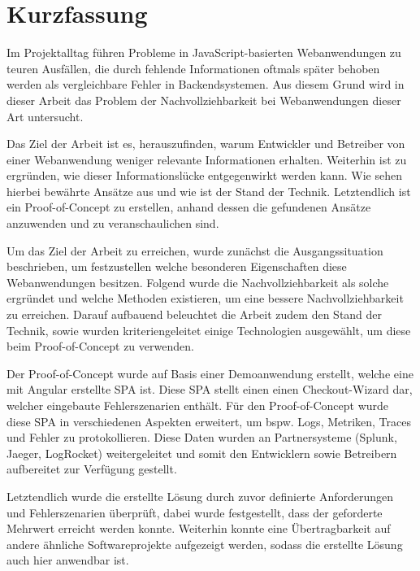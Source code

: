 \section*{\thispagestyle{empty}Kurzfassung}
	
Im Projektalltag führen Probleme in JavaScript-basierten Webanwendungen zu teuren Ausfällen, die durch fehlende Informationen oftmals später behoben werden als vergleichbare Fehler in Backendsystemen. Aus diesem Grund wird in dieser Arbeit das Problem der Nachvollziehbarkeit bei Webanwendungen dieser Art untersucht.
	
Das Ziel der Arbeit ist es, herauszufinden, warum Entwickler und Betreiber von einer Webanwendung weniger relevante Informationen erhalten. Weiterhin ist zu ergründen, wie dieser Informationslücke entgegenwirkt werden kann. Wie sehen hierbei bewährte Ansätze aus und wie ist der Stand der Technik. Letztendlich ist ein Proof-of-Concept zu erstellen, anhand dessen die gefundenen Ansätze anzuwenden und zu veranschaulichen sind.

Um das Ziel der Arbeit zu erreichen, wurde zunächst die Ausgangssituation beschrieben, um festzustellen welche besonderen Eigenschaften diese Webanwendungen besitzen. Folgend wurde die Nachvollziehbarkeit als solche ergründet und welche Methoden existieren, um eine bessere Nachvollziehbarkeit zu erreichen. Darauf aufbauend beleuchtet die Arbeit zudem den Stand der Technik, sowie wurden kriteriengeleitet einige Technologien ausgewählt, um diese beim Proof-of-Concept zu verwenden.

Der Proof-of-Concept wurde auf Basis einer Demoanwendung erstellt, welche eine mit Angular erstellte SPA ist. Diese SPA stellt einen einen Checkout-Wizard dar, welcher eingebaute Fehlerszenarien enthält. Für den Proof-of-Concept wurde diese SPA in verschiedenen Aspekten erweitert, um bspw. Logs, Metriken, Traces und Fehler zu protokollieren. Diese Daten wurden an Partnersysteme (Splunk, Jaeger, LogRocket) weitergeleitet und somit den Entwicklern sowie Betreibern aufbereitet zur Verfügung gestellt.

Letztendlich wurde die erstellte Lösung durch zuvor definierte Anforderungen und Fehlerszenarien überprüft, dabei wurde festgestellt, dass der geforderte Mehrwert erreicht werden konnte. Weiterhin konnte eine Übertragbarkeit auf andere ähnliche Softwareprojekte aufgezeigt werden, sodass die erstellte Lösung auch hier anwendbar ist.

